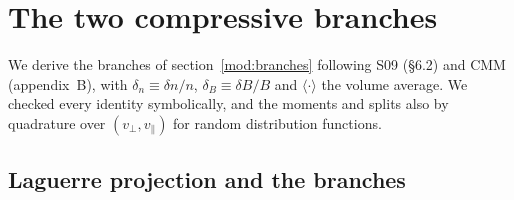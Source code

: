 \section{The two compressive branches}\label{app:branches}

We derive the branches of section~\ref{mod:branches} following S09 (\S6.2) and CMM (appendix~B), with $\delta_n\equiv\delta n/n$, $\delta_B\equiv\delta B/B$ and $\langle\cdot\rangle$ the volume average. We checked every identity symbolically, and the moments and splits also by quadrature over $(v_\perp,v_\parallel)$ for random distribution functions.

\subsection{Laguerre projection and the branches}\label{appA:branches}


